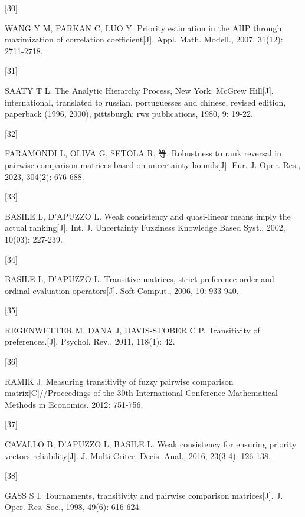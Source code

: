 \documentclass[
  letterpaper,
  DIV=11,
  numbers=noendperiod]{scrartcl}
\newlength{\cslhangindent}
\newlength{\csllabelwidth}
\newenvironment{CSLReferences}[2] %
 {\begin{list}{}{%
  \setlength{\itemindent}{0pt}
  \setlength{\leftmargin}{0pt}
  \setlength{\parsep}{0pt}
  \ifodd #1
   \setlength{\leftmargin}{\cslhangindent}
   \setlength{\itemindent}{-1\cslhangindent}
  \fi
  \setlength{\itemsep}{#2\baselineskip}}}
 {\end{list}}
\newcommand{\CSLLeftMargin}[1]{\parbox[t]{\csllabelwidth}{\strut#1\strut}}
\newcommand{\CSLRightInline}[1]{\parbox[t]{\linewidth - \csllabelwidth}{\strut#1\strut}}
\begin{document}
\begin{CSLReferences}{0}{0}
\CSLLeftMargin{{[}30{]} }%
\CSLRightInline{WANG Y M, PARKAN C, LUO Y. Priority estimation in the
{AHP} through maximization of correlation coefficient{[}J{]}. Appl.
Math. Modell., 2007, 31(12): 2711-2718.}

\CSLLeftMargin{{[}31{]} }%
\CSLRightInline{SAATY T L. The Analytic Hierarchy Process, New York:
McGrew Hill{[}J{]}. international, translated to russian, portuguesses
and chinese, revised edition, paperback (1996, 2000), pittsburgh: rws
publications, 1980, 9: 19-22.}

\CSLLeftMargin{{[}32{]} }%
\CSLRightInline{FARAMONDI L, OLIVA G, SETOLA R, 等. Robustness to rank
reversal in pairwise comparison matrices based on uncertainty
bounds{[}J{]}. Eur. J. Oper. Res., 2023, 304(2): 676-688.}

\CSLLeftMargin{{[}33{]} }%
\CSLRightInline{BASILE L, D'APUZZO L. Weak consistency and quasi-linear
means imply the actual ranking{[}J{]}. Int. J. Uncertainty Fuzziness
Knowledge Based Syst., 2002, 10(03): 227-239.}

\CSLLeftMargin{{[}34{]} }%
\CSLRightInline{BASILE L, D'APUZZO L. Transitive matrices, strict
preference order and ordinal evaluation operators{[}J{]}. Soft Comput.,
2006, 10: 933-940.}

\CSLLeftMargin{{[}35{]} }%
\CSLRightInline{REGENWETTER M, DANA J, DAVIS-STOBER C P. Transitivity of
preferences.{[}J{]}. Psychol. Rev., 2011, 118(1): 42.}

\CSLLeftMargin{{[}36{]} }%
\CSLRightInline{RAMIK J. Measuring transitivity of fuzzy pairwise
comparison matrix{[}C{]}//Proceedings of the 30th International
Conference Mathematical Methods in Economics. 2012: 751-756.}

\CSLLeftMargin{{[}37{]} }%
\CSLRightInline{CAVALLO B, D'APUZZO L, BASILE L. Weak consistency for
ensuring priority vectors reliability{[}J{]}. J. Multi-Criter. Decis.
Anal., 2016, 23(3-4): 126-138.}

\CSLLeftMargin{{[}38{]} }%
\CSLRightInline{GASS S I. Tournaments, transitivity and pairwise
comparison matrices{[}J{]}. J. Oper. Res. Soc., 1998, 49(6): 616-624.}


\end{CSLReferences}
\end{document}
